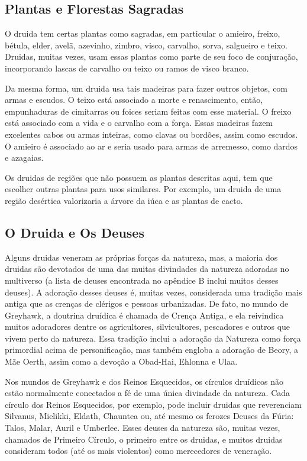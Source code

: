 \documentclass[a4paper,12p]{book}
\begin{document}
		\begin{multicols}{2}
			\subsection{Plantas e Florestas Sagradas}
			O druida tem certas plantas como sagradas, em particular o amieiro, freixo, bétula, elder, avelã, azevinho, zimbro, visco, carvalho, sorva, salgueiro e teixo. Druidas, muitas vezes, usam essas plantas como parte de seu foco de conjuração, incorporando lascas de carvalho ou teixo ou ramos de visco branco. 
			
			Da mesma forma, um druida usa tais madeiras para fazer outros objetos, com armas e escudos. O teixo está associado a morte e renascimento, então, empunhaduras de cimitarras ou foices seriam feitas com esse material. O freixo está associado com a vida e o carvalho com a força. Essas madeiras fazem excelentes cabos ou armas inteiras, como clavas ou bordões, assim como escudos. O amieiro é associado ao ar e seria usado para armas de arremesso, como dardos e azagaias.
			
			Os druidas de regiões que não possuem as plantas descritas aqui, tem que escolher outras plantas para usos similares. Por exemplo, um druida de uma região desértica valorizaria a árvore da iúca e as plantas de cacto.
			
			\subsection{O Druida e Os Deuses}
			Alguns druidas veneram as próprias forças da natureza, mas, a maioria dos druidas são devotados de uma das muitas divindades da natureza adoradas no multiverso (a lista de deuses encontrada no apêndice B inclui muitos desses deuses). A adoração desses deuses é, muitas vezes, considerada uma tradição mais antiga que as crenças de clérigos e pessoas urbanizadas. De fato, no mundo de Greyhawk, a doutrina druídica é chamada de Crença Antiga, e ela reivindica muitos adoradores dentre os agricultores, silvicultores, pescadores e outros que vivem perto da natureza. Essa tradição inclui a adoração da Natureza como força primordial acima de personificação, mas também engloba a adoração de Beory, a Mãe Oerth, assim como a devoção a Obad-Hai, Ehlonna e Ulaa.
			
			Nos mundos de Greyhawk e dos Reinos Esquecidos, os círculos druídicos não estão normalmente conectados a fé de uma única divindade da natureza. Cada círculo dos Reinos Esquecidos, por exemplo, pode incluir druidas que reverenciam Silvanus, Mielikki, Eldath, Chauntea ou, até mesmo os ferozes Deuses da Fúria: Talos, Malar, Auril e Umberlee. Esses deuses da natureza são, muitas vezes, chamados de Primeiro Círculo, o primeiro entre os druidas, e muitos druidas consideram todos (até os mais violentos) como merecedores de veneração.
			

\end{multicols}
\end{document}
